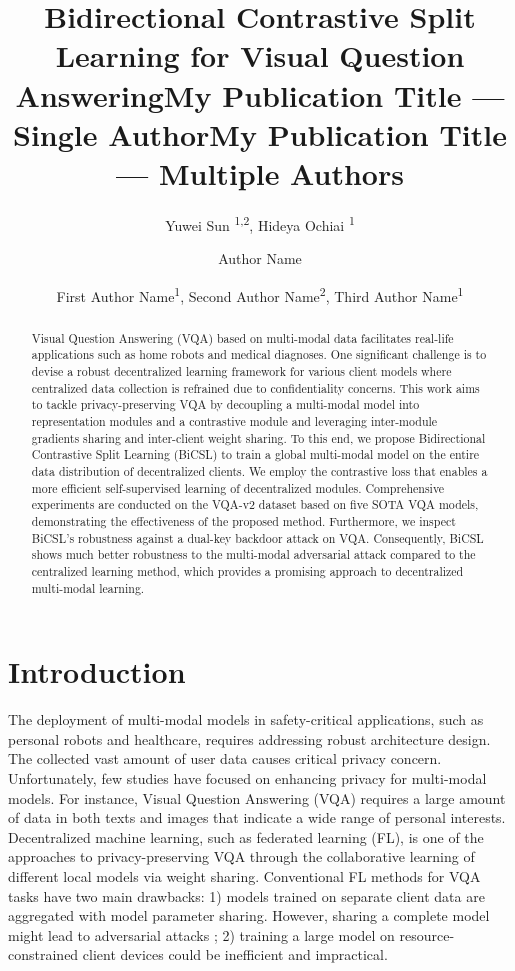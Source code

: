 \documentclass[letterpaper]{article} %
\title{Bidirectional Contrastive Split Learning for Visual Question Answering}
\author{
    Yuwei Sun \textsuperscript{\rm 1,2},
    Hideya Ochiai \textsuperscript{\rm 1}
}
\title{My Publication Title --- Single Author}
\author {
    Author Name
}
\title{My Publication Title --- Multiple Authors}
\author {
    First Author Name\textsuperscript{\rm 1},
    Second Author Name\textsuperscript{\rm 2},
    Third Author Name\textsuperscript{\rm 1}
}
\begin{document}
\maketitle

\begin{abstract}
Visual Question Answering (VQA) based on multi-modal data facilitates real-life applications such as home robots and medical diagnoses. One significant challenge is to devise a robust decentralized learning framework for various client models where centralized data collection is refrained due to confidentiality concerns. This work aims to tackle privacy-preserving VQA by decoupling a multi-modal model into representation modules and a contrastive module and leveraging inter-module gradients sharing and inter-client weight sharing. To this end, we propose Bidirectional Contrastive Split Learning (BiCSL) to train a global multi-modal model on the entire data distribution of decentralized clients. We employ the contrastive loss that enables a more efficient self-supervised learning of decentralized modules. Comprehensive experiments are conducted on the VQA-v2 dataset based on five SOTA VQA models, demonstrating the effectiveness of the proposed method. Furthermore, we inspect BiCSL's robustness against a dual-key backdoor attack on VQA. Consequently, BiCSL shows much better robustness to the multi-modal adversarial attack compared to the centralized learning method, which provides a promising approach to decentralized multi-modal learning.
\end{abstract}


\section{Introduction}

The deployment of multi-modal models in safety-critical applications, such as personal robots and healthcare, requires addressing robust architecture design. The collected vast amount of user data causes critical privacy concern. Unfortunately, few studies have focused on enhancing privacy for multi-modal models. For instance, Visual Question Answering (VQA) requires a large amount of data in both texts and images that indicate a wide range of personal interests. Decentralized machine learning, such as federated learning (FL), is one of the approaches to privacy-preserving VQA through the collaborative learning of different local models via weight sharing. Conventional FL methods \cite{fedavg} for VQA tasks have two main drawbacks: 1) models trained on separate client data are aggregated with model parameter sharing. However, sharing a complete model might lead to adversarial attacks \cite{patch4}; 2) training a large model on resource-constrained client devices could be inefficient and impractical.
\end{document}
